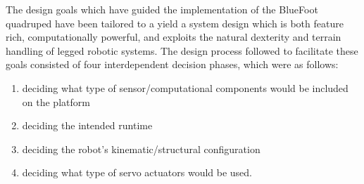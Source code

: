 	The design goals which have guided the implementation of the BlueFoot quadruped have been tailored to a yield a system design which is both feature rich, computationally powerful, and exploits the natural dexterity and terrain handling of legged robotic systems. 
	The design process followed to facilitate these goals consisted of four interdependent decision phases, which were as follows:
		\begin{enumerate}
			\item{deciding what type of sensor/computational components would be included on the platform} 
			\item{deciding the intended runtime}
			\item{deciding the robot's kinematic/structural configuration}
			\item{deciding what type of servo actuators would be used.} 
		\end{enumerate}

